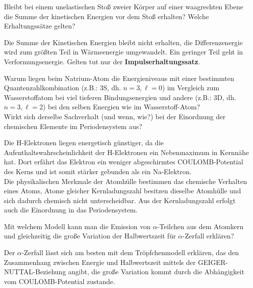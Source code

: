 \documentclass[12pt,a4paper,ngerman]{article}
\begin{document}
\begin{framed}
Bleibt bei einem unelastischen Stoß zweier Körper auf einer waagrechten Ebene die Summe der kinetischen Energien vor dem Stoß erhalten? Welche Erhaltungssätze gelten?
\end{framed}

Die Summe der Kinetischen Energien bleibt nicht erhalten, die Differenzenergie wird zum größten Teil in Wärmeenergie umgewandelt. Ein geringer Teil geht in Verformungsenergie. Gelten tut nur der \textbf{Impulserhaltungssatz}. 



\begin{framed}
Warum liegen beim Natrium-Atom die Energieniveaus mit einer bestimmten Quantenzahlkombination (z.B.: 3S, dh. $n=3,\ell=0$) im Vergleich zum Wasserstoffatom bei viel tieferen Bindungsenergien und andere (z.B.: 3D, dh. $n=3,\ell=2$) bei den selben Energien wie im Wasserstoff-Atom?\\ Wirkt sich derselbe Sachverhalt (und wenn, wie?) bei der Einordnung der chemischen Elemente im Periodensystem aus?
\end{framed}


Die H-Elektronen liegen energetisch günstiger, da die Aufenthaltswahrscheinlichkeit der H-Elektronen ein Nebenmaximum in Kernnähe hat. Dort erfährt das Elektron ein weniger abgeschirmtes COULOMB-Potential des Kerns und ist somit stärker gebunden als ein Na-Elektron. \\
Die physikalischen Merkmale der Atomhülle bestimmen das chemische Verhalten eines Atoms, Atome gleicher Kernladungszahl besitzen dieselbe Atomhülle und sich dadurch chemisch nicht unterscheidbar. Aus der Kernladungszahl erfolgt auch die Einordnung in das Periodensystem. 








\begin{framed}
Mit welchem Modell kann man die Emission von $\alpha$-Teilchen aus dem Atomkern und gleichzeitig die große Variation der Halbwertszeit für $\alpha$-Zerfall erklären?
\end{framed}

Der $\alpha$-Zerfall lässt sich am besten mit dem Tröpfchenmodell erklären, das den Zusammenhang zwischen Energie und Halbwertszeit mittels der GEIGER-NUTTAL-Beziehung angibt, die große Variation kommt durch die Abhängigkeit vom COULOMB-Potential zustande. 
\end{document}
